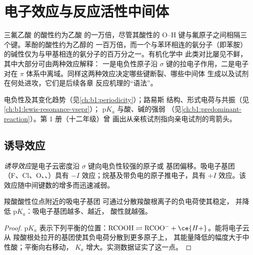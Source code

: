 \chapter{电子效应与反应活性中间体}\label{ch:b1:electronic-effects}

三氟乙酸  的酸性约为乙酸
 的一万倍，尽管其酸性的
O--H 键与氟原子之间相隔三个键。苯酚的酸性约为乙醇的
一百万倍，而一个与苯环相连的氨分子（即苯胺）
的碱性仅为与甲基相连的氨分子的百万分之一。有机化学中
此类对比屡见不鲜，其中大部分可由两种效应解释：
一是电负性原子沿
$\sigma$ 键的拉电子作用，二是电子对在 $\pi$
体系中离域。同样这两种效应决定哪些键断裂、哪些中间体
生成以及试剂在何处进攻，它们是后续各章
反应机理的“语法”。

\begin{recall}
电负性及其变化趋势（见\cref{ch:b1:periodicity}）；路易斯
结构、形式电荷与共振（见\cref{ch:b1:lewis-resonance-vsepr}）；
$\mathrm{p}K_a$ 与酸、碱的强弱
（见\cref{ch:b1:predominant-reaction}）。第 1 册（十二年级）曾
画出从亲核试剂指向亲电试剂的弯箭头。
\end{recall}

\section{诱导效应}

\begin{definition}[诱导效应]\label{def:b1:electronic-effects:inductive}
\emph{诱导效应}是电子云密度沿
$\sigma$ 键向电负性较强的原子或
基团偏移。吸电子基团（F、Cl、O、、）具有 $-I$
效应；烷基及带负电的原子推电子，具有 $+I$
效应。该效应随中间键数的增多而迅速减弱。
\end{definition}

\begin{proposition}[诱导效应与酸性]\label{prop:b1:electronic-effects:inductive-pka}
羧酸酸性位点附近的吸电子基团
可通过分散羧酸根离子的负电荷使其稳定，
并降低 $\mathrm{p}K_a$：吸电子基团越多、越近，
酸性就越强。
\end{proposition}

\begin{proof}
$\mathrm{p}K_a$ 表示下列平衡的位置：$\mathrm{RCOOH} \rightleftharpoons
\mathrm{RCOO^-} + \ce{H+}$。能将电子云从
羧酸根处拉开的基团使其负电荷分散到更多原子上，
其能量降低的幅度大于中性酸；平衡向右移动，
$K_a$ 增大。实测数据证实了这一点。
\end{proof}

